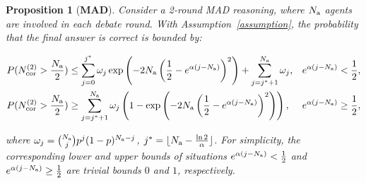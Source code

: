 \documentclass{article} %
\theoremstyle{plain}
\newtheorem{proposition}[theorem]{Proposition}
\begin{document}
\begin{proposition}[\textbf{MAD}]\label{proposition:mad}
    Consider a 2-round MAD reasoning, where $N_{\rm a}$ agents are involved in each debate round. With Assumption~\ref{assumption}, the probability that the final answer is correct is bounded by:
    \begin{small}
    \[
    \begin{aligned}
        &P(N^{(2)}_{\rm cor}>\frac{N_{\rm a}}{2}) \leq \sum_{j=0}^{j^*}\omega_j\exp\left(-2N_{\rm a}\left(\frac{1}{2}-e^{\alpha(j-N_{\rm a})}\right)^2\right)+\sum_{j=j^*+1}^{N_{\rm a}}\omega_j,&e^{\alpha(j-N_{\rm a})}<\frac{1}{2}, \\
        &P(N^{(2)}_{\rm cor}>\frac{N_{\rm a}}{2}) \geq \sum_{j=j^*+1}^{N_{\rm a}}\omega_j\left(1-\exp\left(-2N_{\rm a}\left(\frac{1}{2}-e^{\alpha(j-N_{\rm a})}\right)^2\right)\right), &e^{\alpha(j-N_{\rm a})}\geq\frac{1}{2},
    \end{aligned}
    \]
    \end{small}
    where $\omega_j=\binom{N_{\rm a}}{j}p^j(1-p)^{N_{\rm a}-j}$, $j^*=\lfloor N_{\rm a}-\frac{\ln2}{\alpha}\rfloor$. For simplicity, the corresponding lower and upper bounds of situations $e^{\alpha(j-N_{\rm a})}<\frac{1}{2}$ and $e^{\alpha(j-N_{\rm a})}\geq\frac{1}{2}$ are trivial bounds $0$ and $1$, respectively.
\end{proposition}
\end{document}
